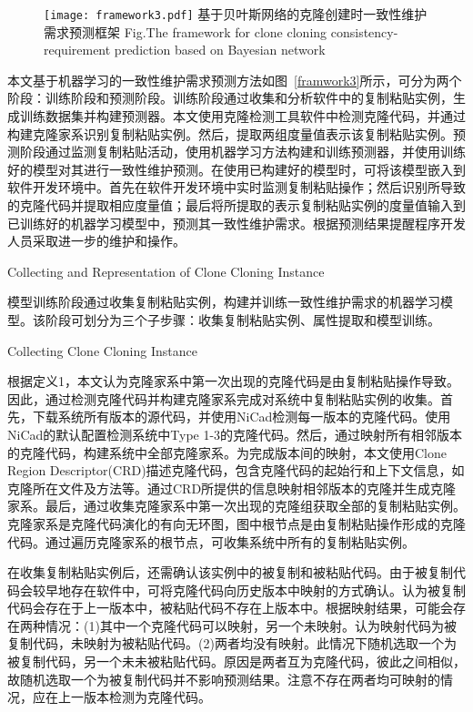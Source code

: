 \begin{figure}[htbp]
\centering
\texttt{[image: framework3.pdf]}
\bicaption[framwork3]{}
{基于贝叶斯网络的克隆创建时一致性维护需求预测框架}
{Fig.$\!$}{The framework for clone cloning consistency-requirement prediction based on Bayesian network}
\vspace{-1em}
\end{figure}

本文基于机器学习的一致性维护需求预测方法如图~\ref{framwork3}所示，可分为两个阶段：训练阶段和预测阶段。训练阶段通过收集和分析软件中的复制粘贴实例，生成训练数据集并构建预测器。本文使用克隆检测工具软件中检测克隆代码，并通过构建克隆家系识别复制粘贴实例。然后，提取两组度量值表示该复制粘贴实例。预测阶段通过监测复制粘贴活动，使用机器学习方法构建和训练预测器，并使用训练好的模型对其进行一致性维护预测。在使用已构建好的模型时，可将该模型嵌入到软件开发环境中。首先在软件开发环境中实时监测复制粘贴操作；然后识别所导致的克隆代码并提取相应度量值；最后将所提取的表示复制粘贴实例的度量值输入到已训练好的机器学习模型中，预测其一致性维护需求。根据预测结果提醒程序开发人员采取进一步的维护和操作。

{Collecting and Representation of Clone Cloning Instance}

模型训练阶段通过收集复制粘贴实例，构建并训练一致性维护需求的机器学习模型。该阶段可划分为三个子步骤：收集复制粘贴实例、属性提取和模型训练。

{Collecting Clone Cloning Instance}

根据定义1，本文认为克隆家系中第一次出现的克隆代码是由复制粘贴操作导致。因此，通过检测克隆代码并构建克隆家系完成对系统中复制粘贴实例的收集。首先，下载系统所有版本的源代码，并使用NiCad检测每一版本的克隆代码。使用NiCad的默认配置检测系统中Type 1-3的克隆代码。然后，通过映射所有相邻版本的克隆代码，构建系统中全部克隆家系。为完成版本间的映射，本文使用Clone Region Descriptor(CRD)\cite{duala2010clone}描述克隆代码，包含克隆代码的起始行和上下文信息，如克隆所在文件及方法等。通过CRD所提供的信息映射相邻版本的克隆并生成克隆家系\cite{ci2013new}。最后，通过收集克隆家系中第一次出现的克隆组获取全部的复制粘贴实例。克隆家系是克隆代码演化的有向无环图，图中根节点是由复制粘贴操作形成的克隆代码。通过遍历克隆家系的根节点，可收集系统中所有的复制粘贴实例。

在收集复制粘贴实例后，还需确认该实例中的被复制和被粘贴代码。由于被复制代码会较早地存在软件中，可将克隆代码向历史版本中映射的方式确认。认为被复制代码会存在于上一版本中，被粘贴代码不存在上版本中。根据映射结果，可能会存在两种情况：(1)其中一个克隆代码可以映射，另一个未映射。认为映射代码为被复制代码，未映射为被粘贴代码。(2)两者均没有映射。此情况下随机选取一个为被复制代码，另一个未未被粘贴代码。原因是两者互为克隆代码，彼此之间相似，故随机选取一个为被复制代码并不影响预测结果。注意不存在两者均可映射的情况，应在上一版本检测为克隆代码。

